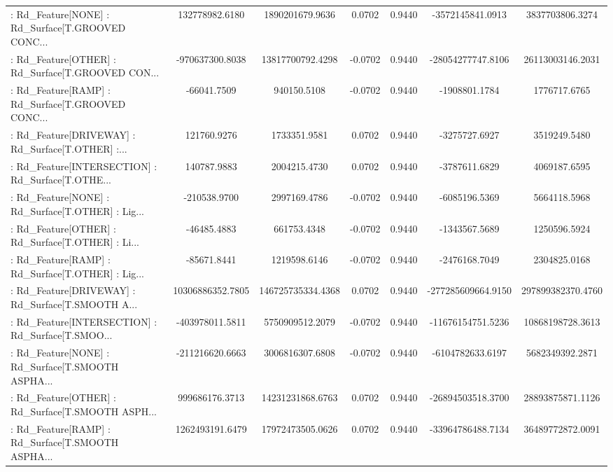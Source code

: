 \begin{longtable}{p{4cm}cccccc}
 : Rd\_Feature[NONE] : Rd\_Surface[T.GROOVED CONC... &    132778982.6180 &   1890201679.9636 &  0.0702 &       0.9440 &   -3572145841.0913 &   3837703806.3274 \\
 : Rd\_Feature[OTHER] : Rd\_Surface[T.GROOVED CON... &   -970637300.8038 &  13817700792.4298 & -0.0702 &       0.9440 &  -28054277747.8106 &  26113003146.2031 \\
 : Rd\_Feature[RAMP] : Rd\_Surface[T.GROOVED CONC... &       -66041.7509 &       940150.5108 & -0.0702 &       0.9440 &      -1908801.1784 &      1776717.6765 \\
 : Rd\_Feature[DRIVEWAY] : Rd\_Surface[T.OTHER] :... &       121760.9276 &      1733351.9581 &  0.0702 &       0.9440 &      -3275727.6927 &      3519249.5480 \\
 : Rd\_Feature[INTERSECTION] : Rd\_Surface[T.OTHE... &       140787.9883 &      2004215.4730 &  0.0702 &       0.9440 &      -3787611.6829 &      4069187.6595 \\
 : Rd\_Feature[NONE] : Rd\_Surface[T.OTHER] : Lig... &      -210538.9700 &      2997169.4786 & -0.0702 &       0.9440 &      -6085196.5369 &      5664118.5968 \\
 : Rd\_Feature[OTHER] : Rd\_Surface[T.OTHER] : Li... &       -46485.4883 &       661753.4348 & -0.0702 &       0.9440 &      -1343567.5689 &      1250596.5924 \\
 : Rd\_Feature[RAMP] : Rd\_Surface[T.OTHER] : Lig... &       -85671.8441 &      1219598.6146 & -0.0702 &       0.9440 &      -2476168.7049 &      2304825.0168 \\
 : Rd\_Feature[DRIVEWAY] : Rd\_Surface[T.SMOOTH A... &  10306886352.7805 & 146725735334.4368 &  0.0702 &       0.9440 & -277285609664.9150 & 297899382370.4760 \\
 : Rd\_Feature[INTERSECTION] : Rd\_Surface[T.SMOO... &   -403978011.5811 &   5750909512.2079 & -0.0702 &       0.9440 &  -11676154751.5236 &  10868198728.3613 \\
 : Rd\_Feature[NONE] : Rd\_Surface[T.SMOOTH ASPHA... &   -211216620.6663 &   3006816307.6808 & -0.0702 &       0.9440 &   -6104782633.6197 &   5682349392.2871 \\
 : Rd\_Feature[OTHER] : Rd\_Surface[T.SMOOTH ASPH... &    999686176.3713 &  14231231868.6763 &  0.0702 &       0.9440 &  -26894503518.3700 &  28893875871.1126 \\
 : Rd\_Feature[RAMP] : Rd\_Surface[T.SMOOTH ASPHA... &   1262493191.6479 &  17972473505.0626 &  0.0702 &       0.9440 &  -33964786488.7134 &  36489772872.0091 \\

\end{longtable}
